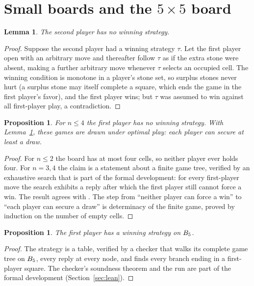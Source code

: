 \documentclass[11pt]{amsart}
\newtheorem{lemma}[theorem]{Lemma}
\newtheorem{proposition}[theorem]{Proposition}
\theoremstyle{definition}
\theoremstyle{remark}
\begin{document}
\section{Small boards and the \texorpdfstring{$5 \times 5$}{5 x 5} board}\label{sec:small}

\begin{lemma}\label{lem:stealing}
The second player has no winning strategy.
\end{lemma}

\begin{proof}
Suppose the second player had a winning strategy $\tau$. Let the first
player open with an arbitrary move and thereafter follow $\tau$ as if
the extra stone were absent, making a further arbitrary move whenever
$\tau$ selects an occupied cell. The winning condition is monotone in a
player's stone set, so surplus stones never hurt (a surplus stone may
itself complete a square, which ends the game in the first player's
favor), and the first player wins; but $\tau$ was assumed to win
against all first-player play, a contradiction.
\end{proof}

\begin{proposition}\label{prop:small}
For $n \le 4$ the first player has no winning strategy. With
Lemma~\ref{lem:stealing}, these games are drawn under optimal play:
each player can secure at least a draw.
\end{proposition}

\begin{proof}
For $n \le 2$ the board has at most four cells, so neither player ever
holds four. For $n = 3, 4$ the claim is a statement about a finite game
tree, verified by an exhaustive search that is part of the formal
development: for every first-player move the search exhibits a reply
after which the first player still cannot force a win. The result
agrees with \cite{jenrich}.
The step from ``neither player can force a win'' to ``each player can
secure a draw'' is determinacy of the finite game, proved by induction
on the number of empty cells.
\end{proof}

\begin{proposition}\label{prop:five}
The first player has a winning strategy on $B_5$.
\end{proposition}

\begin{proof}
The strategy is a table, verified by a checker that walks its complete
game tree on $B_5$, every reply at every node, and finds every
branch ending in a first-player square. The checker's soundness theorem
and the run are part of the formal development
(Section~\ref{sec:lean}).
\end{proof}
\end{document}
